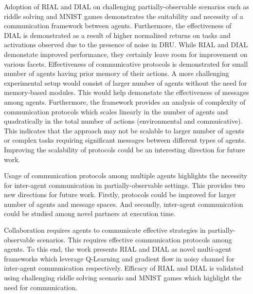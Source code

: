 \documentclass[11pt,letterpaper]{article}
\begin{document}
Adoption of RIAL and DIAL on challenging partially-observable scenarios such as riddle solving and MNIST games demonstrates the suitability and necessity of a communication framework between agents. Furthermore, the effectiveness of DIAL is demonstrated as a result of higher normalized returns on tasks and activations observed due to the presence of noise in DRU. While RIAL and DIAL demonstate improved performance, they certainly leave room for improvement on various facets. Effectiveness of communicative protocols is demonstrated for small number of agents having prior memory of their actions. A more challenging experimental setup would consist of larger number of agents without the need for memory-based modules. This would help demonstate the effectiveness of messages among agents. Furthermore, the framework provides an analysis of complexity of communication protocols which scales linearly in the number of agents and quadratically in the total number of actions (environmental and commuicative). This indicates that the approach may not be scalable to larger number of agents or complex tasks requiring significant messages between different types of agents. Improving the scalability of protocols could be an interesting direction for future work. 

Usage of communication protocols among multiple agents highlights the necessity for inter-agent communication in partially-observable settings. This provides two new directions for future work. Firstly, protocols could be improved for larger number of agents and message spaces. And secondly, inter-agent communication could be studied among novel partners at execution time. 

Collaboration requires agents to communicate effective strategies in partially-observable scenarios. This requires effective communication protocols among agents. To this end, the work presents RIAL and DIAL as novel multi-agent frameworks which leverage Q-Learning and gradient flow in noisy channel for inter-agent communication respectively. Efficacy of RIAL and DIAL is validated using challenging riddle solving scenario and MNIST games which highlight the need for communication. 
\end{document}
